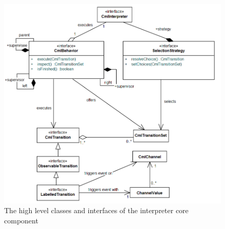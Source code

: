 \documentclass[a4paper, 10pt]{include/compassreport}   %
\begin{document}
\begin{figure}[ht!]
  \begin{center}
    \includegraphics[width=1\textwidth]{figures/toplevelStructure}
    \caption{The high level classes and interfaces of the interpreter core component}
    \label{fig:interpreter_topLevelStructure}
  \end{center}
\end{figure}
\end{document}
